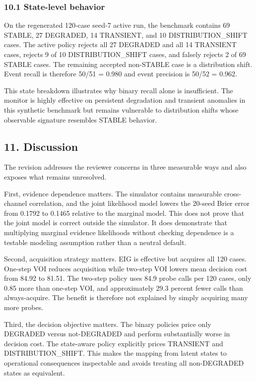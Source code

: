 \documentclass[
]{article}
\begin{document}
\subsubsection{10.1 State-level behavior}\label{101-state-level-behavior}

On the regenerated 120-case seed-7 active run, the benchmark contains 69 STABLE, 27 DEGRADED, 14 TRANSIENT, and 10 DISTRIBUTION\_SHIFT cases. The active policy rejects all 27 DEGRADED and all 14 TRANSIENT cases, rejects 9 of 10 DISTRIBUTION\_SHIFT cases, and falsely rejects 2 of 69 STABLE cases. The remaining accepted non-STABLE case is a distribution shift. Event recall is therefore 50/51 = 0.980 and event precision is 50/52 = 0.962.

This state breakdown illustrates why binary recall alone is insufficient. The monitor is highly effective on persistent degradation and transient anomalies in this synthetic benchmark but remains vulnerable to distribution shifts whose observable signature resembles STABLE behavior.

\subsection{11. Discussion}\label{11-discussion}

The revision addresses the reviewer concerns in three measurable ways and also exposes what remains unresolved.

First, evidence dependence matters. The simulator contains measurable cross-channel correlation, and the joint likelihood model lowers the 20-seed Brier error from 0.1792 to 0.1465 relative to the marginal model. This does not prove that the joint model is correct outside the simulator. It does demonstrate that multiplying marginal evidence likelihoods without checking dependence is a testable modeling assumption rather than a neutral default.

Second, acquisition strategy matters. EIG is effective but acquires all 120 cases. One-step VOI reduces acquisition while two-step VOI lowers mean decision cost from 84.92 to 81.51. The two-step policy uses 84.9 probe calls per 120 cases, only 0.85 more than one-step VOI, and approximately 29.3 percent fewer calls than always-acquire. The benefit is therefore not explained by simply acquiring many more probes.

Third, the decision objective matters. The binary policies price only DEGRADED versus not-DEGRADED and perform substantially worse in decision cost. The state-aware policy explicitly prices TRANSIENT and DISTRIBUTION\_SHIFT. This makes the mapping from latent states to operational consequences inspectable and avoids treating all non-DEGRADED states as equivalent.
\end{document}
